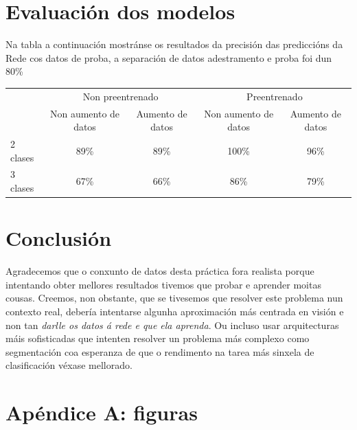 \documentclass{article}
\begin{document}
\newpage
\section{Evaluación dos modelos}

Na tabla a continuación mostránse os resultados da precisión das prediccións da Rede cos datos de proba, a separación de datos adestramento e proba foi dun 80\%

\begin{table}[H]
\begin{tabular}{l|cc|cc|}
\cline{2-5}
                               & \multicolumn{2}{c|}{Non preentrenado}                        & \multicolumn{2}{c|}{Preentrenado}                            \\ \cline{2-5} 
                               & \multicolumn{1}{c|}{Non aumento de datos} & Aumento de datos & \multicolumn{1}{c|}{Non aumento de datos} & Aumento de datos \\ \hline
\multicolumn{1}{|l|}{2 clases} & \multicolumn{1}{c|}{89\%}                 & 89\%             & \multicolumn{1}{c|}{100\%}                & 96\%             \\ \hline
\multicolumn{1}{|l|}{3 clases} & \multicolumn{1}{c|}{67\%}                 & 66\%             & \multicolumn{1}{c|}{86\%}                 & 79\%             \\ \hline
\end{tabular}
\end{table}

\section{Conclusión}

Agradecemos que o conxunto de datos desta práctica fora realista porque intentando obter mellores resultados tivemos que probar e aprender moitas cousas. Creemos, non obstante, que se tivesemos que resolver este problema nun contexto real, debería intentarse algunha aproximación más centrada en visión e non tan \emph{darlle os datos á rede e que ela aprenda}. Ou incluso usar arquitecturas máis sofisticadas que intenten resolver un problema más complexo como segmentación coa esperanza de que o rendimento na tarea más sinxela de clasificación véxase mellorado.

\newpage

\section{Apéndice A: figuras}
\end{document}

